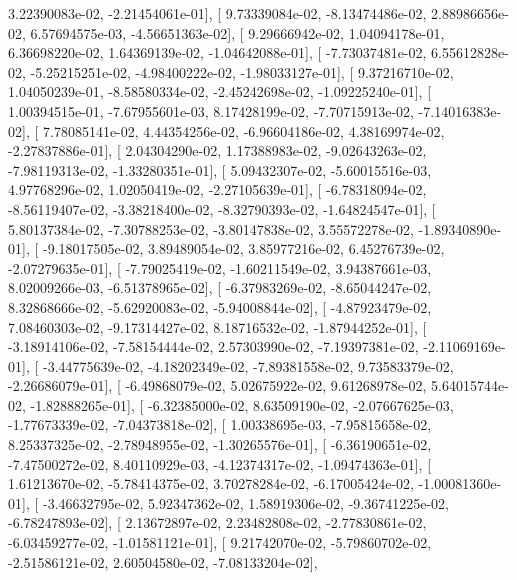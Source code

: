 \documentclass{article}
\begin{document}
          3.22390083e-02,  -2.21454061e-01],
       [  9.73339084e-02,  -8.13474486e-02,   2.88986656e-02,
          6.57694575e-03,  -4.56651363e-02],
       [  9.29666942e-02,   1.04094178e-01,   6.36698220e-02,
          1.64369139e-02,  -1.04642088e-01],
       [ -7.73037481e-02,   6.55612828e-02,  -5.25215251e-02,
         -4.98400222e-02,  -1.98033127e-01],
       [  9.37216710e-02,   1.04050239e-01,  -8.58580334e-02,
         -2.45242698e-02,  -1.09225240e-01],
       [  1.00394515e-01,  -7.67955601e-03,   8.17428199e-02,
         -7.70715913e-02,  -7.14016383e-02],
       [  7.78085141e-02,   4.44354256e-02,  -6.96604186e-02,
          4.38169974e-02,  -2.27837886e-01],
       [  2.04304290e-02,   1.17388983e-02,  -9.02643263e-02,
         -7.98119313e-02,  -1.33280351e-01],
       [  5.09432307e-02,  -5.60015516e-03,   4.97768296e-02,
          1.02050419e-02,  -2.27105639e-01],
       [ -6.78318094e-02,  -8.56119407e-02,  -3.38218400e-02,
         -8.32790393e-02,  -1.64824547e-01],
       [  5.80137384e-02,  -7.30788253e-02,  -3.80147838e-02,
          3.55572278e-02,  -1.89340890e-01],
       [ -9.18017505e-02,   3.89489054e-02,   3.85977216e-02,
          6.45276739e-02,  -2.07279635e-01],
       [ -7.79025419e-02,  -1.60211549e-02,   3.94387661e-03,
          8.02009266e-03,  -6.51378965e-02],
       [ -6.37983269e-02,  -8.65044247e-02,   8.32868666e-02,
         -5.62920083e-02,  -5.94008844e-02],
       [ -4.87923479e-02,   7.08460303e-02,  -9.17314427e-02,
          8.18716532e-02,  -1.87944252e-01],
       [ -3.18914106e-02,  -7.58154444e-02,   2.57303990e-02,
         -7.19397381e-02,  -2.11069169e-01],
       [ -3.44775639e-02,  -4.18202349e-02,  -7.89381558e-02,
          9.73583379e-02,  -2.26686079e-01],
       [ -6.49868079e-02,   5.02675922e-02,   9.61268978e-02,
          5.64015744e-02,  -1.82888265e-01],
       [ -6.32385000e-02,   8.63509190e-02,  -2.07667625e-03,
         -1.77673339e-02,  -7.04373818e-02],
       [  1.00338695e-03,  -7.95815658e-02,   8.25337325e-02,
         -2.78948955e-02,  -1.30265576e-01],
       [ -6.36190651e-02,  -7.47500272e-02,   8.40110929e-03,
         -4.12374317e-02,  -1.09474363e-01],
       [  1.61213670e-02,  -5.78414375e-02,   3.70278284e-02,
         -6.17005424e-02,  -1.00081360e-01],
       [ -3.46632795e-02,   5.92347362e-02,   1.58919306e-02,
         -9.36741225e-02,  -6.78247893e-02],
       [  2.13672897e-02,   2.23482808e-02,  -2.77830861e-02,
         -6.03459277e-02,  -1.01581121e-01],
       [  9.21742070e-02,  -5.79860702e-02,  -2.51586121e-02,
          2.60504580e-02,  -7.08133204e-02],
\end{document}
